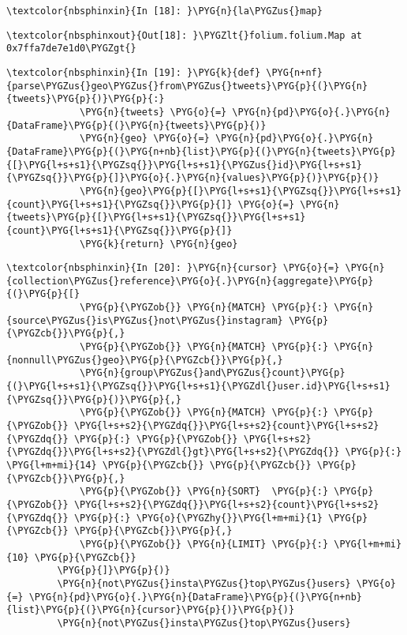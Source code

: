 \documentclass[letterpaper,10pt,english]{sphinxmanual}
\begin{document}
%
\begin{Verbatim}[commandchars=\\\{\}]
\textcolor{nbsphinxin}{In [18]: }\PYG{n}{la\PYGZus{}map}
\end{Verbatim}

%
\begin{Verbatim}[commandchars=\\\{\}]
\textcolor{nbsphinxout}{Out[18]: }\PYGZlt{}folium.folium.Map at 0x7ffa7de7e1d0\PYGZgt{}
\end{Verbatim}

%
\begin{Verbatim}[commandchars=\\\{\}]
\textcolor{nbsphinxin}{In [19]: }\PYG{k}{def} \PYG{n+nf}{parse\PYGZus{}geo\PYGZus{}from\PYGZus{}tweets}\PYG{p}{(}\PYG{n}{tweets}\PYG{p}{)}\PYG{p}{:}
             \PYG{n}{tweets} \PYG{o}{=} \PYG{n}{pd}\PYG{o}{.}\PYG{n}{DataFrame}\PYG{p}{(}\PYG{n}{tweets}\PYG{p}{)}
             \PYG{n}{geo} \PYG{o}{=} \PYG{n}{pd}\PYG{o}{.}\PYG{n}{DataFrame}\PYG{p}{(}\PYG{n+nb}{list}\PYG{p}{(}\PYG{n}{tweets}\PYG{p}{[}\PYG{l+s+s1}{\PYGZsq{}}\PYG{l+s+s1}{\PYGZus{}id}\PYG{l+s+s1}{\PYGZsq{}}\PYG{p}{]}\PYG{o}{.}\PYG{n}{values}\PYG{p}{)}\PYG{p}{)}
             \PYG{n}{geo}\PYG{p}{[}\PYG{l+s+s1}{\PYGZsq{}}\PYG{l+s+s1}{count}\PYG{l+s+s1}{\PYGZsq{}}\PYG{p}{]} \PYG{o}{=} \PYG{n}{tweets}\PYG{p}{[}\PYG{l+s+s1}{\PYGZsq{}}\PYG{l+s+s1}{count}\PYG{l+s+s1}{\PYGZsq{}}\PYG{p}{]}
             \PYG{k}{return} \PYG{n}{geo}
\end{Verbatim}

%
\begin{Verbatim}[commandchars=\\\{\}]
\textcolor{nbsphinxin}{In [20]: }\PYG{n}{cursor} \PYG{o}{=} \PYG{n}{collection\PYGZus{}reference}\PYG{o}{.}\PYG{n}{aggregate}\PYG{p}{(}\PYG{p}{[}
             \PYG{p}{\PYGZob{}} \PYG{n}{MATCH} \PYG{p}{:} \PYG{n}{source\PYGZus{}is\PYGZus{}not\PYGZus{}instagram} \PYG{p}{\PYGZcb{}}\PYG{p}{,}
             \PYG{p}{\PYGZob{}} \PYG{n}{MATCH} \PYG{p}{:} \PYG{n}{nonnull\PYGZus{}geo}\PYG{p}{\PYGZcb{}}\PYG{p}{,}
             \PYG{n}{group\PYGZus{}and\PYGZus{}count}\PYG{p}{(}\PYG{l+s+s1}{\PYGZsq{}}\PYG{l+s+s1}{\PYGZdl{}user.id}\PYG{l+s+s1}{\PYGZsq{}}\PYG{p}{)}\PYG{p}{,}
             \PYG{p}{\PYGZob{}} \PYG{n}{MATCH} \PYG{p}{:} \PYG{p}{\PYGZob{}} \PYG{l+s+s2}{\PYGZdq{}}\PYG{l+s+s2}{count}\PYG{l+s+s2}{\PYGZdq{}} \PYG{p}{:} \PYG{p}{\PYGZob{}} \PYG{l+s+s2}{\PYGZdq{}}\PYG{l+s+s2}{\PYGZdl{}gt}\PYG{l+s+s2}{\PYGZdq{}} \PYG{p}{:} \PYG{l+m+mi}{14} \PYG{p}{\PYGZcb{}} \PYG{p}{\PYGZcb{}} \PYG{p}{\PYGZcb{}}\PYG{p}{,}
             \PYG{p}{\PYGZob{}} \PYG{n}{SORT}  \PYG{p}{:} \PYG{p}{\PYGZob{}} \PYG{l+s+s2}{\PYGZdq{}}\PYG{l+s+s2}{count}\PYG{l+s+s2}{\PYGZdq{}} \PYG{p}{:} \PYG{o}{\PYGZhy{}}\PYG{l+m+mi}{1} \PYG{p}{\PYGZcb{}} \PYG{p}{\PYGZcb{}}\PYG{p}{,}
             \PYG{p}{\PYGZob{}} \PYG{n}{LIMIT} \PYG{p}{:} \PYG{l+m+mi}{10} \PYG{p}{\PYGZcb{}}
         \PYG{p}{]}\PYG{p}{)}
         \PYG{n}{not\PYGZus{}insta\PYGZus{}top\PYGZus{}users} \PYG{o}{=} \PYG{n}{pd}\PYG{o}{.}\PYG{n}{DataFrame}\PYG{p}{(}\PYG{n+nb}{list}\PYG{p}{(}\PYG{n}{cursor}\PYG{p}{)}\PYG{p}{)}
         \PYG{n}{not\PYGZus{}insta\PYGZus{}top\PYGZus{}users}
\end{Verbatim}
\end{document}

